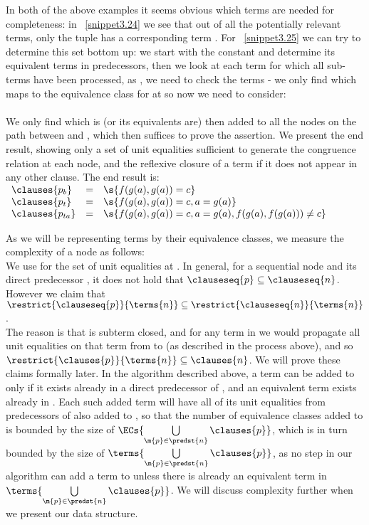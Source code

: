 In both of the above examples it seems obvious which terms are needed for completeness: in ~\ref{snippet3.24} we see that out of all the potentially relevant terms, only the tuple  has a corresponding term .
For ~\ref{snippet3.25} we can try to determine this set bottom up: we start with the constant  and determine its equivalent terms in predecessors, then we look at each term for which all sub-terms have been processed, as , we need to check the terms  - we only find  which maps to the equivalence class for  at  so now we need to consider: \\
\\
We only find  which is (or its equivalents are) then added to all the nodes on the path between  and , which then suffices to prove the assertion. 
We present the end result, showing only a set of unit equalities sufficient to generate the congruence relation at each node, 
and the reflexive closure of a term if it does not appear in any other clause.
The end result is:\\
$
\begin{array}{llll}
	\clauses{p_b}    & = & \s{f(g(a),g(a))=c} \\
	\clauses{p_t}    & = & \s{f(g(a),g(a))=c,a=g(a)} \\
	\clauses{p_{ta}} & = & \s{f(g(a),g(a))=c,a=g(a),f(g(a),f(g(a))) \neq c} \\
\end{array}
$

As we will be representing terms by their equivalence classes, we measure the complexity of a node  as follows:\\
We use  for the set of unit equalities at .
In general, for a sequential node  and its direct predecessor , it does not hold that 
$\clauseseq{p} \subseteq \clauseseq{n}$.
However we claim that $\restrict{\clauseseq{p}}{\terms{n}} \subseteq \restrict{\clauseseq{n}}{\terms{n}}$.\\
The reason is that  is subterm closed, and for any term in  we would propagate all unit equalities on that term from  to  (as described in the process above), and so $\restrict{\clauses{p}}{\terms{n}} \subseteq \clauses{n}$. We will prove these claims formally later.
In the algorithm described above, a term can be added to  only if it exists already in a direct predecessor of , and an equivalent term exists already in . Each such added term will have all of its unit equalities from predecessors of  also added to , so that the number of equivalence classes added to  is bounded by the size of $\ECs{\bigcup\limits_{\m{p} \in \predst{n}} \clauses{p}}$, which is in turn bounded by the size of $\terms{\bigcup\limits_{\m{p} \in \predst{n}} \clauses{p}}$, as no step in our algorithm can add a term to  unless there is already an equivalent term in $\terms{\bigcup\limits_{\m{p} \in \predst{n}} \clauses{p}}$.
We will discuss complexity further when we present our data structure.

